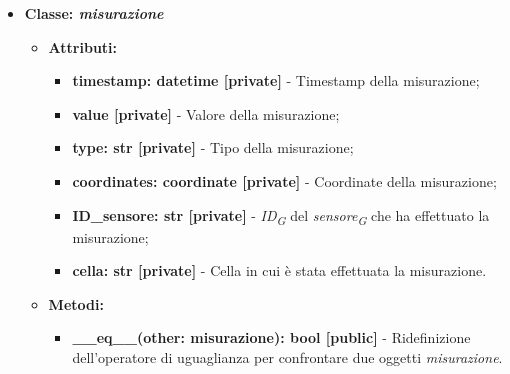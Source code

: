 \begin{itemize}
    \item\textbf{Classe: \textit{misurazione}}
    \begin{itemize}
        \item \textbf{Attributi:} 
    \begin{itemize}
        \item \textbf{timestamp: datetime [private]} - Timestamp della misurazione;
        \item \textbf{value [private]} - Valore della misurazione;
        \item \textbf{type: str [private]} - Tipo della misurazione;
        \item \textbf{coordinates: coordinate [private]} - Coordinate della misurazione;
        \item \textbf{ID\_sensore: str [private]} - \textit{ID}\textsubscript{\textit{G}} del \textit{sensore}\textsubscript{\textit{G}} che ha effettuato la misurazione;
        \item \textbf{cella: str [private]} - Cella in cui è stata effettuata la misurazione.
    \end{itemize}
    \item \textbf{Metodi:} 
    \begin{itemize}
        \item \textbf{\_\_eq\_\_(other: misurazione): bool [public]} - Ridefinizione dell'operatore di uguaglianza per confrontare due oggetti \textit{misurazione}.
    \end{itemize}
\end{itemize}


\end{itemize}
